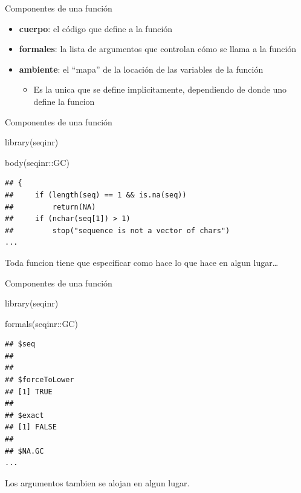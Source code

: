 \documentclass[
  10pt,
  ignorenonframetext,
]{beamer}
\newenvironment{Shaded}{\begin{snugshade}}{\end{snugshade}}
\newcommand{\FunctionTok}[1]{\textcolor[rgb]{0.00,0.00,0.00}{#1}}
\newcommand{\NormalTok}[1]{#1}
\newcommand{\SpecialCharTok}[1]{\textcolor[rgb]{0.00,0.00,0.00}{#1}}
\providecommand{\tightlist}{%
  \setlength{\itemsep}{0pt}\setlength{\parskip}{0pt}}
\begin{document}
\begin{frame}{Componentes de una función}
\protect\hypertarget{componentes-de-una-funciuxf3n}{}
\begin{itemize}
\item
  \textbf{cuerpo}: el código que define a la función \vspace{12pt}
\item
  \textbf{formales}: la lista de argumentos que controlan cómo se llama
  a la función \vspace{12pt}
\item
  \textbf{ambiente}: el ``mapa'' de la locación de las variables de la
  función

  \begin{itemize}
  \tightlist
  \item
    Es la unica que se define implicitamente, dependiendo de donde uno
    define la funcion
  \end{itemize}
\end{itemize}
\end{frame}

\begin{frame}[fragile]{Componentes de una función}
\protect\hypertarget{componentes-de-una-funciuxf3n-1}{}
\begin{Shaded}
\begin{Highlighting}[]
\FunctionTok{library}\NormalTok{(seqinr)}

\FunctionTok{body}\NormalTok{(seqinr}\SpecialCharTok{::}\NormalTok{GC)}
\end{Highlighting}
\end{Shaded}

\begin{verbatim}
## {
##     if (length(seq) == 1 && is.na(seq)) 
##         return(NA)
##     if (nchar(seq[1]) > 1) 
##         stop("sequence is not a vector of chars")
...
\end{verbatim}

Toda funcion tiene que especificar como hace lo que hace en algun
lugar\ldots{}
\end{frame}

\begin{frame}[fragile]{Componentes de una función}
\protect\hypertarget{componentes-de-una-funciuxf3n-2}{}
\begin{Shaded}
\begin{Highlighting}[]
\FunctionTok{library}\NormalTok{(seqinr)}

\FunctionTok{formals}\NormalTok{(seqinr}\SpecialCharTok{::}\NormalTok{GC)}
\end{Highlighting}
\end{Shaded}

\begin{verbatim}
## $seq
## 
## 
## $forceToLower
## [1] TRUE
## 
## $exact
## [1] FALSE
## 
## $NA.GC
...
\end{verbatim}

Los argumentos tambien se alojan en algun lugar.
\end{frame}
\end{document}
